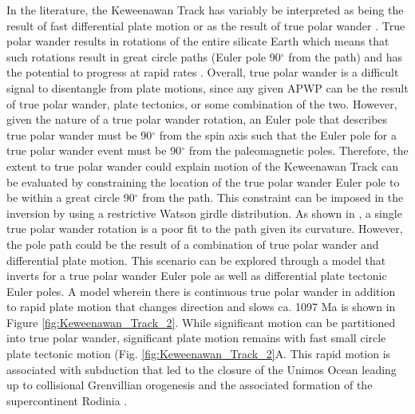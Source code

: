 \documentclass[11pt,letterpaper]{article}
\begin{document}

In the literature, the Keweenawan Track has variably be interpreted as being the result of fast differential plate motion \citep[e.g.][]{Davis1997a} or as the result of true polar wander \citep[e.g.][]{Evans2003b}. True polar wander results in rotations of the entire silicate Earth which means that such rotations result in great circle paths (Euler pole 90$^\circ$ from the path) and has the potential to progress at rapid rates \citep{Rose2017b}. Overall, true polar wander is a difficult signal to disentangle from plate motions, since any given APWP can be the result of true polar wander, plate tectonics, or some combination of the two. However, given the nature of a true polar wander rotation, an Euler pole that describes true polar wander must be 90$^\circ$ from the spin axis such that the Euler pole for a true polar wander event must be 90$^\circ$ from the paleomagnetic poles. Therefore, the extent to true polar wander could explain motion of the Keweenawan Track can be evaluated by constraining the location of the true polar wander Euler pole to be within a great circle 90$^\circ$ from the path. This constraint can be imposed in the inversion by using a restrictive Watson girdle distribution. As shown in \cite{Swanson-Hysell2019a}, a single true polar wander rotation is a poor fit to the path given its curvature. However, the pole path could be the result of a combination of true polar wander and differential plate motion. This scenario can be explored through a model that inverts for a true polar wander Euler pole as well as differential plate tectonic Euler poles. A model wherein there is continuous true polar wander in addition to rapid plate motion that changes direction and slows ca. 1097 Ma is shown in Figure \ref{fig:Keweenawan_Track_2}. While significant motion can be partitioned into true polar wander, significant plate motion remains with fast small circle plate tectonic motion (Fig. \ref{fig:Keweenawan_Track_2}A. This rapid motion is associated with subduction that led to the closure of the Unimos Ocean leading up to collisional Grenvillian orogenesis and the associated formation of the supercontinent Rodinia \citep{Hynes2010a, Swanson-Hysell2022a}.
\end{document}
